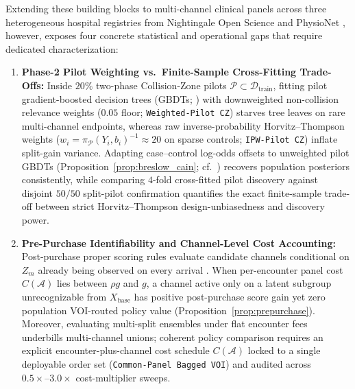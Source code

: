 \documentclass[11pt]{article}
\theoremstyle{remark}
\begin{document}
Extending these building blocks to multi-channel clinical panels across three heterogeneous hospital registries from Nightingale Open Science and PhysioNet \citep{nightingale2024platform,mullainathan2022diagnosing,kansal2025mcmed,goldberger2000physionet,obermeyer2026ecg}, however, exposes four concrete statistical and operational gaps that require dedicated characterization:
\begin{enumerate}
  \item \textbf{Phase-2 Pilot Weighting vs.\ Finite-Sample Cross-Fitting Trade-Offs:} Inside $20\%$ two-phase Collision-Zone pilots $\mathcal{P} \subset \mathcal{D}_{\text{train}}$, fitting pilot gradient-boosted decision trees (GBDTs; \citealp{ke2017lightgbm}) with downweighted non-collision relevance weights ($0.05$ floor; \texttt{Weighted-Pilot CZ}) starves tree leaves on rare multi-channel endpoints, whereas raw inverse-probability Horvitz--Thompson weights ($w_i = \pi_{\mathcal{P}}(Y_i, b_i)^{-1} \approx 20$ on sparse controls; \texttt{IPW-Pilot CZ}) inflate split-gain variance. Adapting \citet{breslow1988logistic} case--control log-odds offsets to unweighted pilot GBDTs (Proposition~\ref{prop:breslow_cain}; cf.\ \citealp{tao2017efficient}) recovers population posteriors consistently, while comparing $4$-fold cross-fitted pilot discovery against disjoint $50/50$ split-pilot confirmation quantifies the exact finite-sample trade-off between strict Horvitz--Thompson design-unbiasedness and discovery power.
  \item \textbf{Pre-Purchase Identifiability and Channel-Level Cost Accounting:} Post-purchase proper scoring rules evaluate candidate channels conditional on $Z_m$ already being observed on every arrival \citep{bilgic2011value}. When per-encounter panel cost $C(\mathcal{A})$ lies between $\rho g$ and $g$, a channel active only on a latent subgroup unrecognizable from $X_{\text{base}}$ has positive post-purchase score gain yet zero population VOI-routed policy value (Proposition~\ref{prop:prepurchase}). Moreover, evaluating multi-split ensembles under flat encounter fees underbills multi-channel unions; coherent policy comparison requires an explicit encounter-plus-channel cost schedule $C(\mathcal{A})$ locked to a single deployable order set (\texttt{Common-Panel Bagged VOI}) and audited across $0.5\times\text{--}3.0\times$ cost-multiplier sweeps.

\end{enumerate}
\end{document}
